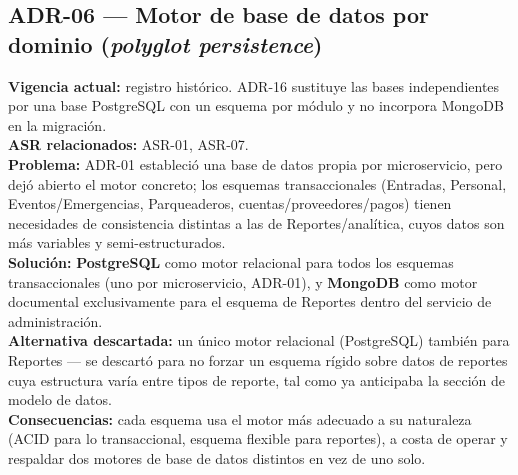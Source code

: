 \documentclass[11pt,a4paper]{article}
\begin{document}
\subsection*{ADR-06 --- Motor de base de datos por dominio (\textit{polyglot persistence})}
\textbf{Vigencia actual:} registro histórico. ADR-16 sustituye las bases independientes por una base PostgreSQL con un esquema por módulo y no incorpora MongoDB en la migración.\\
\textbf{ASR relacionados:} ASR-01, ASR-07.\\
\textbf{Problema:} ADR-01 estableció una base de datos propia por microservicio, pero dejó abierto
el motor concreto; los esquemas transaccionales (Entradas, Personal, Eventos/Emergencias,
Parqueaderos, cuentas/proveedores/pagos) tienen necesidades de consistencia distintas a las de
Reportes/analítica, cuyos datos son más variables y semi-estructurados.\\
\textbf{Solución:} \textbf{PostgreSQL} como motor relacional para todos los esquemas transaccionales
(uno por microservicio, ADR-01), y \textbf{MongoDB} como motor documental exclusivamente para el
esquema de Reportes dentro del servicio de administración.\\
\textbf{Alternativa descartada:} un único motor relacional (PostgreSQL) también para Reportes — se
descartó para no forzar un esquema rígido sobre datos de reportes cuya estructura varía entre tipos
de reporte, tal como ya anticipaba la sección de modelo de datos.\\
\textbf{Consecuencias:} cada esquema usa el motor más adecuado a su naturaleza (ACID para lo
transaccional, esquema flexible para reportes), a costa de operar y respaldar dos motores de base de
datos distintos en vez de uno solo.
\end{document}
